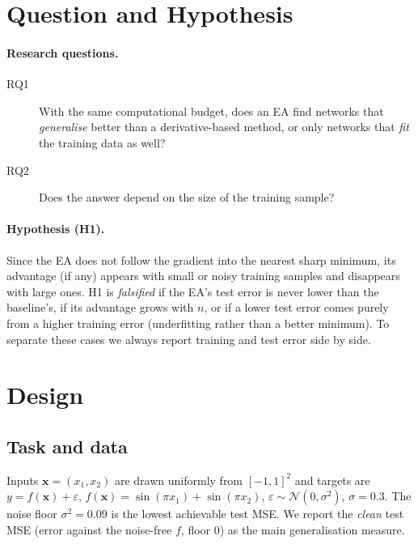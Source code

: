 \documentclass[11pt,a4paper]{article}
\newcommand{\nfloor}{\sigma^2}
\begin{document}
\section{Question and Hypothesis}

\paragraph{Research questions.}
\begin{description}
  \item[RQ1] With the same computational budget, does an EA find networks that \emph{generalise} better
  than a derivative-based method, or only networks that \emph{fit} the training data as well?
  \item[RQ2] Does the answer depend on the size of the training sample?
\end{description}

\paragraph{Hypothesis (H1).}
Since the EA does not follow the gradient into the nearest sharp minimum, its advantage (if any) appears
with small or noisy training samples and disappears with large ones.
H1 is \emph{falsified} if the EA's test error is never lower than the baseline's, if its advantage
grows with $n$, or if a lower test error comes purely from a higher training error (underfitting rather
than a better minimum). To separate these cases we always report training and test error side by side.



\section{Design}

\subsection{Task and data}

Inputs $\bm x=(x_1,x_2)$ are drawn uniformly from $[-1,1]^2$ and targets are
$y = f(\bm x) + \varepsilon$, $f(\bm x)=\sin(\pi x_1)+\sin(\pi x_2)$,
$\varepsilon\sim\mathcal{N}(0,\sigma^2)$, $\sigma=0.3$.
The noise floor $\nfloor=0.09$ is the lowest achievable test MSE. We report the \emph{clean} test MSE
(error against the noise-free $f$, floor $0$) as the main generalisation measure.
\end{document}

